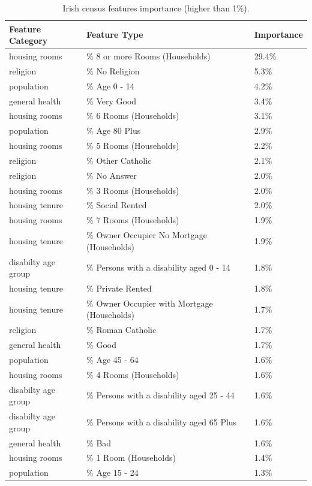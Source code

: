 \documentclass[]{elsarticle} %
\begin{document}
\begin{table}[!h]

\caption{\label{tab:census-features-table}Irish census features importance (higher than 1\%).}
\centering
\fontsize{8}{10}\selectfont
\begin{tabu} to 
\toprule
Feature Category & Feature Type & Importance\\
\midrule
housing rooms & \% 8 or more Rooms (Households) & 29.4\%\\
religion & \% No Religion & 5.3\%\\
population & \% Age 0 - 14 & 4.2\%\\
general health & \% Very Good & 3.4\%\\
housing rooms & \% 6 Rooms (Households) & 3.1\%\\
population & \% Age 80 Plus & 2.9\%\\
housing rooms & \% 5 Rooms (Households) & 2.2\%\\
religion & \% Other Catholic & 2.1\%\\
religion & \% No Answer & 2.0\%\\
housing rooms & \% 3 Rooms (Households) & 2.0\%\\
housing tenure & \% Social Rented & 2.0\%\\
housing rooms & \% 7 Rooms (Households) & 1.9\%\\
housing tenure & \% Owner Occupier No Mortgage (Households) & 1.9\%\\
disabilty age group & \% Persons with a disability aged 0 - 14 & 1.8\%\\
housing tenure & \% Private Rented & 1.8\%\\
housing tenure & \% Owner Occupier with Mortgage (Households) & 1.7\%\\
religion & \% Roman Catholic & 1.7\%\\
general health & \% Good & 1.7\%\\
population & \% Age 45 - 64 & 1.6\%\\
housing rooms & \% 4 Rooms (Households) & 1.6\%\\
disabilty age group & \% Persons with a disability aged 25 - 44 & 1.6\%\\
disabilty age group & \% Persons with a disability aged 65 Plus & 1.6\%\\
general health & \% Bad & 1.6\%\\
housing rooms & \% 1 Room (Households) & 1.4\%\\
population & \% Age 15 - 24 & 1.3\%\\

\end{tabu}
\end{table}
\end{document}
